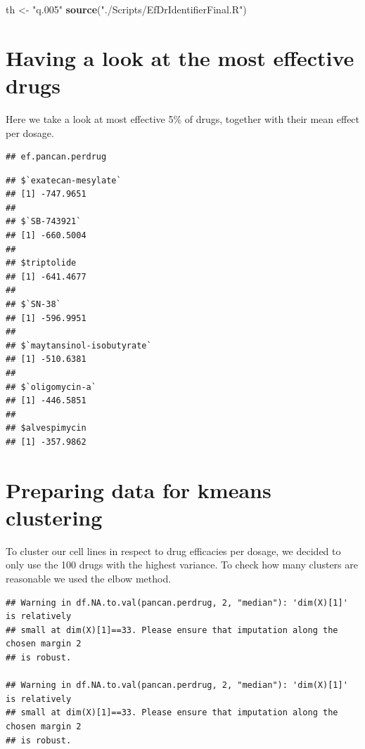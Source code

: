 \documentclass[
]{article}
\newenvironment{Shaded}{\begin{snugshade}}{\end{snugshade}}
\newcommand{\KeywordTok}[1]{\textcolor[rgb]{0.13,0.29,0.53}{\textbf{#1}}}
\newcommand{\NormalTok}[1]{#1}
\newcommand{\StringTok}[1]{\textcolor[rgb]{0.31,0.60,0.02}{#1}}
\begin{document}
\begin{Shaded}
\begin{Highlighting}[]
\NormalTok{th <-}\StringTok{ "q.005"}
\KeywordTok{source}\NormalTok{(}\StringTok{"./Scripts/EfDrIdentifierFinal.R"}\NormalTok{)}
\end{Highlighting}
\end{Shaded}

\hypertarget{having-a-look-at-the-most-effective-drugs}{%
\section{Having a look at the most effective
drugs}\label{having-a-look-at-the-most-effective-drugs}}

Here we take a look at most effective 5\% of drugs, together with their
mean effect per dosage.

\begin{verbatim}
## ef.pancan.perdrug
\end{verbatim}

\begin{verbatim}
## $`exatecan-mesylate`
## [1] -747.9651
## 
## $`SB-743921`
## [1] -660.5004
## 
## $triptolide
## [1] -641.4677
## 
## $`SN-38`
## [1] -596.9951
## 
## $`maytansinol-isobutyrate`
## [1] -510.6381
## 
## $`oligomycin-a`
## [1] -446.5851
## 
## $alvespimycin
## [1] -357.9862
\end{verbatim}

\hypertarget{preparing-data-for-kmeans-clustering}{%
\section{Preparing data for kmeans
clustering}\label{preparing-data-for-kmeans-clustering}}

To cluster our cell lines in respect to drug efficacies per dosage, we
decided to only use the 100 drugs with the highest variance. To check
how many clusters are reasonable we used the elbow method.

\begin{verbatim}
## Warning in df.NA.to.val(pancan.perdrug, 2, "median"): 'dim(X)[1]' is relatively
## small at dim(X)[1]==33. Please ensure that imputation along the chosen margin 2
## is robust.

## Warning in df.NA.to.val(pancan.perdrug, 2, "median"): 'dim(X)[1]' is relatively
## small at dim(X)[1]==33. Please ensure that imputation along the chosen margin 2
## is robust.
\end{verbatim}
\end{document}
